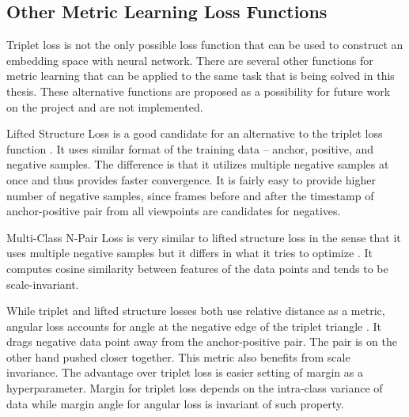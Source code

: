 \subsection{\label{sec:other-loss}Other Metric Learning Loss Functions}

Triplet loss is not the only possible loss function that can be used to construct an embedding space with neural network. There are several other functions for metric learning that can be applied to the same task that is being solved in this thesis. These alternative functions are proposed as a possibility for future work on the project and are not implemented.

Lifted Structure Loss is a good candidate for an alternative to the triplet loss function \cite{lifted-structure}. It uses similar format of the training data -- anchor, positive, and negative samples. The difference is that it utilizes multiple negative samples at once and thus provides faster convergence. It is fairly easy to provide higher number of negative samples, since frames before and after the timestamp of anchor-positive pair from all viewpoints are candidates for negatives.

Multi-Class N-Pair Loss is very similar to lifted structure loss in the sense that it uses multiple negative samples but it differs in what it tries to optimize \cite{multiclass-NIPS2016_6b180037}. It computes cosine similarity between features of the data points and tends to be scale-invariant. 

While triplet and lifted structure losses both use relative distance as a metric, angular loss accounts for angle at the negative edge of the triplet triangle \cite{angular-loss}. It drags negative data point away from the anchor-positive pair. The pair is on the other hand pushed closer together. This metric also benefits from scale invariance. The advantage over triplet loss is easier setting of margin as a hyperparameter. Margin for triplet loss depends on the intra-class variance of data while margin angle for angular loss is invariant of such property.
